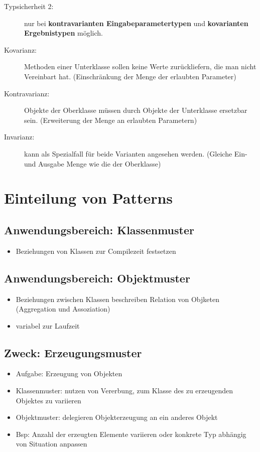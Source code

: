 \documentclass[11pt, fleqn, a4paper, leqno]{scrartcl} %
\begin{document}
\begin{description}
			\item[Typsicherheit 2:] nur bei \textbf{kontravarianten Eingabeparametertypen} und \textbf{kovarianten Ergebnistypen} möglich.
			\item[Kovarianz:] Methoden einer Unterklasse sollen keine Werte zurückliefern, die man nicht Vereinbart hat. (Einschränkung der Menge der erlaubten Parameter)
			\item[Kontravarianz:]Objekte der Oberklasse müssen durch Objekte der Unterklasse ersetzbar sein. (Erweiterung der Menge an erlaubten Parametern)
			\item[Invarianz:] kann als Spezialfall für beide Varianten angesehen werden. (Gleiche Ein- und Ausgabe Menge wie die der Oberklasse)
			\end{description}
	\section{Einteilung von Patterns}
		\subsection{Anwendungsbereich: Klassenmuster}
			\begin{itemize}
				\item Beziehungen von Klassen zur Compilezeit festsetzen
			\end{itemize}
		\subsection{Anwendungsbereich: Objektmuster}
			\begin{itemize}
				\item Beziehungen zwischen Klassen beschreiben Relation von Objketen (Aggregation und Assoziation)
				\item variabel zur Laufzeit
			\end{itemize}
		\subsection{Zweck: Erzeugungsmuster}
			\begin{itemize}
				\item Aufgabe: Erzeugung von Objekten
				\item Klassenmuster: nutzen von Vererbung, zum Klasse des zu erzeugenden Objektes zu variieren
				\item Objektmuster: delegieren Objekterzeugung an ein anderes Objekt
				\item Bsp: Anzahl der erzeugten Elemente variieren oder konkrete Typ abhängig von Situation anpassen		
			\end{itemize}
\end{document}
